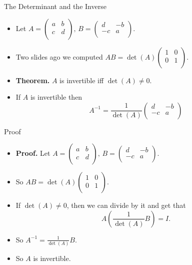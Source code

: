 \documentclass{beamer}
\begin{document}
\begin{frame}{The Determinant and the Inverse}

\begin{itemize}
\item Let
$A=
\begin{pmatrix}
a & b  \\
c & d  \\
\end{pmatrix}
\text{, }
B=
\begin{pmatrix}
d & -b  \\
-c & a  \\
\end{pmatrix}.
$
\item Two slides ago we computed
$AB = \det(A)
\begin{pmatrix}
1 & 0  \\
0 & 1  \\
\end{pmatrix}
$.
\item \textbf{Theorem.} $A$ is invertible iff $\det(A)\not=0$.
\item If $A$ is invertible then
$$A^{-1} = \frac{1}{\det(A)}
\begin{pmatrix}
d & -b  \\
-c & a  \\
\end{pmatrix}
$$
\end{itemize}
\end{frame}

\begin{frame}{Proof}

\begin{itemize}
\item \textbf{Proof.} Let
$A=
\begin{pmatrix}
a & b  \\
c & d  \\
\end{pmatrix}
\text{, }
B=
\begin{pmatrix}
d & -b  \\
-c & a  \\
\end{pmatrix}.
$
\item So
$AB = \det(A)
\begin{pmatrix}
1 & 0  \\
0 & 1  \\
\end{pmatrix}
$.
\item If $\det(A)\not=0$, then we can divide by it and get that
$$A \left ( \frac{1}{\det(A)}B \right) = I.$$
\item So $A^{-1} = \frac{1}{\det(A)}B$.
\item So $A$ is invertible.
\end{itemize}
\end{frame}
\end{document}
